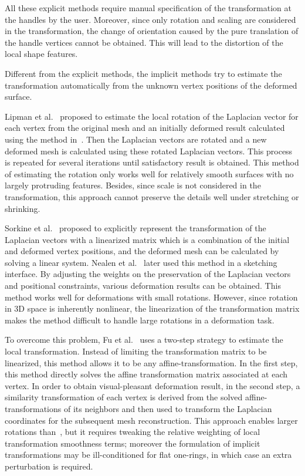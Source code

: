 All these explicit methods require manual  specification of the
transformation at the handles by the user. Moreover, since only
rotation and scaling are considered in the transformation, the
change of orientation caused by the pure translation of the handle
vertices cannot be obtained. This will lead to the distortion of the
local shape features.

Different from the explicit methods, the  implicit methods try to
estimate the transformation automatically from the unknown vertex
positions of the deformed surface.

Lipman et al.~\cite{LSCLRS04} proposed to  estimate the local
rotation of the Laplacian vector for each vertex from the original
mesh and an initially deformed result calculated using the method
in~\cite{AM01}. Then the Laplacian vectors are rotated and a new
deformed mesh is calculated using these rotated Laplacian vectors.
This process is repeated for several iterations until satisfactory
result is obtained. This method of estimating the rotation only
works well for relatively smooth surfaces with no largely protruding
features. Besides, since scale is not considered in the
transformation, this approach cannot preserve the details well under
stretching or shrinking.

Sorkine et al.~\cite{SCLARS04} proposed  to explicitly represent the
transformation of the Laplacian vectors with a linearized matrix
which is a combination of the initial and deformed vertex positions,
and the deformed mesh can be calculated by solving a linear system.
Nealen et al.~\cite{NSAC05} later used this method in a sketching
interface. By adjusting the weights on the preservation of the
Laplacian vectors and positional constraints, various deformation
results can be obtained. This method works well for deformations
with small rotations. However, since rotation in 3D space is
inherently nonlinear, the linearization of the transformation matrix
makes the method difficult to handle large rotations in a
deformation task.

To overcome this problem, Fu et al.~\cite{FAT07}  uses a two-step
strategy to estimate the local transformation. Instead of limiting
the transformation matrix to be linearized, this method allows it to
be any affine-transformation. In the first step, this method
directly solves the affine transformation matrix associated at each
vertex. In order to obtain visual-pleasant deformation result, in
the second step, a similarity transformation of each vertex is
derived from the solved affine-transformations of its neighbors and
then used to transform the Laplacian coordinates for the subsequent
mesh reconstruction. This approach enables larger rotations
than~\cite{SCLARS04}, but it requires tweaking the relative
weighting of local transformation smoothness terms; moreover the
formulation of implicit transformations may be ill-conditioned for
flat one-rings, in which case an extra perturbation is required.

